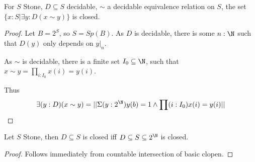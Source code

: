 \begin{lemma}
  For $S$ Stone, $D\subseteq S$ decidable, 
  $\sim$ a decidable equivalence relation on $S$,
  the set $\{x:S | \exists y : D (x\sim y)\}$ is closed. 
\end{lemma}
\begin{proof}
  Let $B = 2^S$, so $S = Sp(B)$. 
  As $D$ is decidable, 
  there is some $n:\N$ such that $D(y)$ only depends on $y|_n$. 

  As $\sim$ is decidable, there is a finite set $I_0\subseteq \N$,
  such that $x\sim y = \prod_{i:I_0} x(i) = y(i)$. 

  Thus 
  $$
   \exists (y : D) (x\sim y) = 
  || \Sigma(y:2^\N) y(b) = 1 \wedge \prod(i:I_0) x(i) = y(i)||
  $$
\end{proof}



\begin{lemma}
  Let $S$ Stone, then $D\subseteq S$ is closed iff 
  $D\subseteq S\subseteq 2^{\N}$ is closed. 
\end{lemma}
\begin{proof}
  Follows immediately from countable intersection of basic clopen. 
\end{proof}





